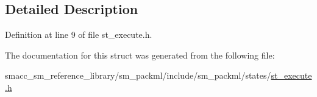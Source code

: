 \subsection{Detailed Description}


Definition at line 9 of file st\+\_\+execute.\+h.



The documentation for this struct was generated from the following file\+:\begin{DoxyCompactItemize}
\item 
smacc\+\_\+sm\+\_\+reference\+\_\+library/sm\+\_\+packml/include/sm\+\_\+packml/states/\hyperlink{st__execute_8h}{st\+\_\+execute.\+h}\end{DoxyCompactItemize}
